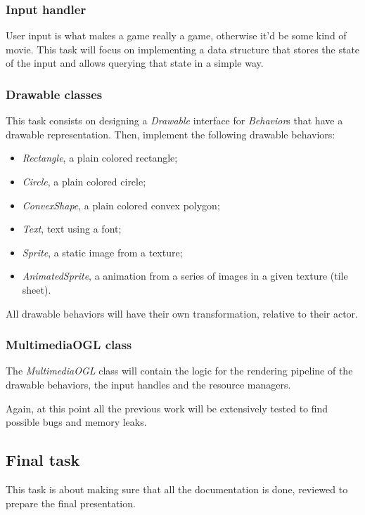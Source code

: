 \subsubsection{Input handler}

User input is what makes a game really a game, otherwise it'd be some kind of movie. 
This task will focus on implementing a data structure that stores the state of the 
input and allows querying that state in a simple way.


\subsubsection{Drawable classes}

This task consists on designing a \textit{Drawable} interface for \textit{Behavior}s 
that have a drawable representation. Then, implement the following drawable behaviors:

\begin{itemize}
\item \textit{Rectangle}, a plain colored rectangle;
\item \textit{Circle}, a plain colored circle;
\item \textit{ConvexShape}, a plain colored convex polygon;
\item \textit{Text}, text using a font;
\item \textit{Sprite}, a static image from a texture;
\item \textit{AnimatedSprite}, a animation from a series of images in a given texture (tile 
sheet).
\end{itemize}

All drawable behaviors will have their own transformation, relative to their actor.

\subsubsection{MultimediaOGL class}

The \textit{MultimediaOGL} class will contain the logic for the rendering pipeline 
of the drawable behaviors, the input handles and the resource managers.

Again, at this point all the previous work will be extensively tested to find possible 
bugs and memory leaks.

\subsection{Final task}

This task is about making sure that all the documentation is done, reviewed to prepare 
the final presentation.
